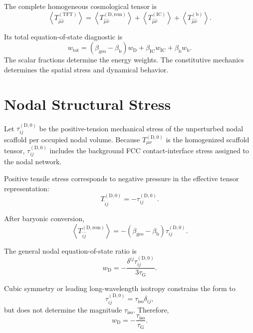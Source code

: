 The complete homogeneous cosmological tensor is
\begin{equation}
    \left\langle T_{\hat{\mu}\hat{\nu}}^{(\mathrm{TFT})} \right\rangle = \left\langle T_{\hat{\mu}\hat{\nu}}^{(\mathrm{D},\mathrm{rem})} \right\rangle + \left\langle T_{\hat{\mu}\hat{\nu}}^{(\mathrm{IC})} \right\rangle + \left\langle T_{\hat{\mu}\hat{\nu}}^{(\mathrm{b})} \right\rangle.
\end{equation}

Its total equation-of-state diagnostic is
\begin{equation}
    w_{\mathrm{tot}} = \left( \beta_{\mathrm{geo}} - \beta_{\mathrm{b}} \right) w_{\mathrm{D}} + \beta_{\mathrm{IC}}w_{\mathrm{IC}} + \beta_{\mathrm{b}}w_{\mathrm{b}}.
\end{equation}
The scalar fractions determine the energy weights. The constitutive mechanics determines the spatial stress and dynamical behavior.

\section{Nodal Structural Stress}

Let $\tau_{ij}^{(\mathrm{D},0)}$ be the positive-tension mechanical stress of the unperturbed nodal scaffold per occupied nodal volume. Because $T_{\mu\nu}^{(\mathrm{D},0)}$ is the homogenized scaffold tensor, $\tau_{ij}^{(\mathrm{D},0)}$ includes the background FCC contact-interface stress assigned to the nodal network.

Positive tensile stress corresponds to negative pressure in the effective tensor representation:
\begin{equation}
    T_{\hat{i}\hat{j}}^{(\mathrm{D},0)} = -\tau_{ij}^{(\mathrm{D},0)}.
\end{equation}

After baryonic conversion,
\begin{equation}
    \left\langle T_{\hat{i}\hat{j}}^{(\mathrm{D},\mathrm{rem})} \right\rangle = -\left( \beta_{\mathrm{geo}} - \beta_{\mathrm{b}} \right) \tau_{ij}^{(\mathrm{D},0)}.
\end{equation}

The general nodal equation-of-state ratio is
\begin{equation}
    w_{\mathrm{D}} = -\frac{ \delta^{ij}\tau_{ij}^{(\mathrm{D},0)} }{ 3\tau_{\mathrm{G}} }.
\end{equation}

Cubic symmetry or leading long-wavelength isotropy constrains the form to
\begin{equation}
    \tau_{ij}^{(\mathrm{D},0)} = \tau_{\mathrm{iso}}\delta_{ij},
\end{equation}
but does not determine the magnitude $\tau_{\mathrm{iso}}$. Therefore,
\begin{equation}
    w_{\mathrm{D}} = -\frac{\tau_{\mathrm{iso}}}{\tau_{\mathrm{G}}}.
\end{equation}

